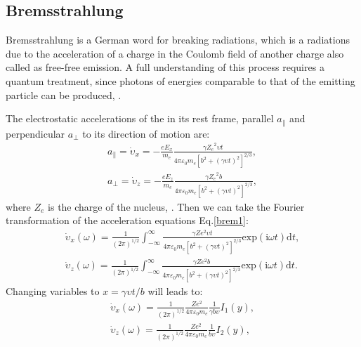 \documentclass[oneside,a4paper,11pt]{report}
\begin{document}
\subsection{Bremsstrahlung}
Bremsstrahlung is a German word for breaking radiations, which is a radiations due to the acceleration 
of a charge in the Coulomb field of another charge also called as free-free emission. A full 
understanding of this process requires a quantum treatment, since photons of energies comparable 
to that of the emitting particle can be produced, \citet{rybicki:1}.

The electrostatic accelerations of the in its rest frame, parallel $a_{\parallel}$ and perpendicular 
$a_\perp$ to its direction of motion are:        
\begin{equation}
\label{brem1}
\begin{split}
a_{\parallel} = \dot{\upsilon}_x = -\frac{eE_x}{m_e}\frac{\gamma {Z_e}^2 \upsilon t}{4\pi \varepsilon_0 m_e \left [ b^2 + \left ( \gamma \upsilon t \right )^2  \right ]^{2/3}} , \\ 
a_\perp  = \dot{\upsilon}_z = -\frac{eE_z}{m_e}\frac{\gamma {Z_e}^2 b}{4\pi \varepsilon_0 m_e \left [ b^2 + \left ( \gamma \upsilon t \right )^2  \right ]^{2/3}} ,
\end{split}
\end{equation}
where $Z_e$ is the charge of the nucleus, \citet{longair:1}. 
Then we can take the Fourier transformation of the acceleration equations Eq.\eqref{brem1}:
\begin{equation}
 \label{brem2}
\begin{split}
\dot{\upsilon}_x(\omega) = \frac{1}{(2\pi)^{1/2}}\int_{-\infty }^{\infty} \frac{\gamma Ze^2 \upsilon t}{4\pi \varepsilon_0 m_e \left [ b^2 + \left ( \gamma \upsilon t \right )^2 \right ]^{2/3} } \mathrm{exp}\left ( \mathrm{i} \omega t \right )\mathrm{d} t, \\
\dot{\upsilon}_z(\omega) = \frac{1}{(2\pi)^{1/2}}\int_{-\infty }^{\infty} \frac{\gamma Ze^2b}{4\pi \varepsilon_0 m_e \left [ b^2 + \left ( \gamma \upsilon t \right )^2 \right ]^{2/3} } \mathrm{exp}\left ( \mathrm{i} \omega t \right )\mathrm{d} t.
\end{split}
\end{equation}
Changing variables to $x = \gamma \upsilon t / b$ will leads to:
\begin{equation}
 \label{brem3}
\begin{split}
\dot{\upsilon}_x(\omega) = \frac{1}{(2\pi)^{1/2}} \frac{Ze^2}{4 \pi \varepsilon_0 m_e} \frac{1}{\gamma b \upsilon} I_1(y), \\
\dot{\upsilon}_z(\omega) = \frac{1}{(2\pi)^{1/2}} \frac{Ze^2}{4 \pi \varepsilon_0 m_e} \frac{1}{b \upsilon} I_2(y),
\end{split}
\end{equation}
\end{document}
